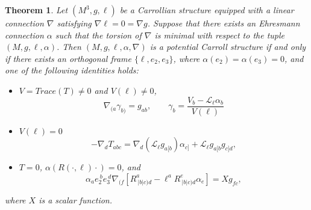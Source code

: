 \documentclass{article}
\newtheorem{theorem}{Theorem}[section]
\theoremstyle{definition}
\theoremstyle{remark}
\begin{document}
\begin{theorem} \label{Thm:PCSconnection}
    Let $(M^3,g,\ell)$ be a Carrollian structure equipped with a linear connection $\nabla$ satisfying $\nabla \ell = 0 = \nabla g$.
    Suppose that there exists an Ehresmann connection $\alpha$ such that the torsion of $\nabla$ is minimal with respect to the tuple $(M,g,\ell,\alpha)$. Then $(M,g,\ell,\alpha,\nabla)$ is a potential Carroll structure if and only if there exists an orthogonal frame $\{\ell,e_2,e_3\}$, where $\alpha(e_2) = \alpha(e_3) = 0$, and one of the following identities holds:
        \begin{itemize}
        \item $V = Trace(T) \neq 0$ and $V(\ell) \neq 0$, 
        $$\nabla_{(a}\gamma_{b)} = g_{ab}, \qquad \gamma_b = \frac{V_b-\mathcal{L}_\ell \alpha_b}{V(\ell)} $$
        \item $V(\ell) = 0$
        $$-\nabla_d T_{abc} = \nabla_d (\mathcal{L}_\ell g_{a[b}) \alpha_{c]} + \mathcal{L}_\ell g_{a[b} g_{c]d}, $$
        \item $T = 0$, $\alpha(R(\cdot,\ell) \cdot ) = 0$, and 
        $$ \alpha_a e_2^{~b} e_3^{~d} \nabla_{(f} \left[ R^a_{~|b|c)d} - \ell^a R^e_{~|b|c)d}\alpha_e \right]  = X g_{fc}, $$
    \end{itemize}
    where $X$ is a scalar function.
\end{theorem}
\end{document}
